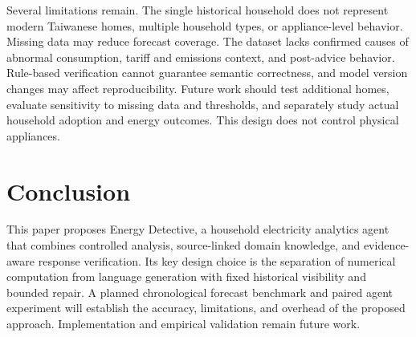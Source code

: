\documentclass[conference]{IEEEtran}
\newcommand{\project}{Energy Detective}
\begin{document}
Several limitations remain. The single historical household does not represent modern Taiwanese homes, multiple household types, or appliance-level behavior. Missing data may reduce forecast coverage. The dataset lacks confirmed causes of abnormal consumption, tariff and emissions context, and post-advice behavior. Rule-based verification cannot guarantee semantic correctness, and model version changes may affect reproducibility. Future work should test additional homes, evaluate sensitivity to missing data and thresholds, and separately study actual household adoption and energy outcomes. This design does not control physical appliances.

\section{Conclusion}
This paper proposes \project, a household electricity analytics agent that combines controlled analysis, source-linked domain knowledge, and evidence-aware response verification. Its key design choice is the separation of numerical computation from language generation with fixed historical visibility and bounded repair. A planned chronological forecast benchmark and paired agent experiment will establish the accuracy, limitations, and overhead of the proposed approach. Implementation and empirical validation remain future work.


\end{document}
